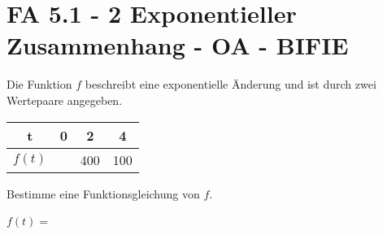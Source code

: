 \section{FA 5.1 - 2 Exponentieller Zusammenhang - OA - BIFIE}


\begin{beispiel}[FA 5.1]{1} %
Die Funktion $f$ beschreibt eine exponentielle Änderung und ist durch zwei Wertepaare angegeben. \leer

\begin{center}
\begin{tabular}{|c|c|c|c|} \hline
\cellcolor{light-gray} t & 0 & 2 & 4 \\ \hline
\cellcolor{light-gray} $f(t)$ &  & 400 & 100 \\ \hline
\end{tabular}
\end{center}

Bestimme eine Funktionsgleichung von $f$.

\leer

$f(t)=$\,
\end{beispiel}